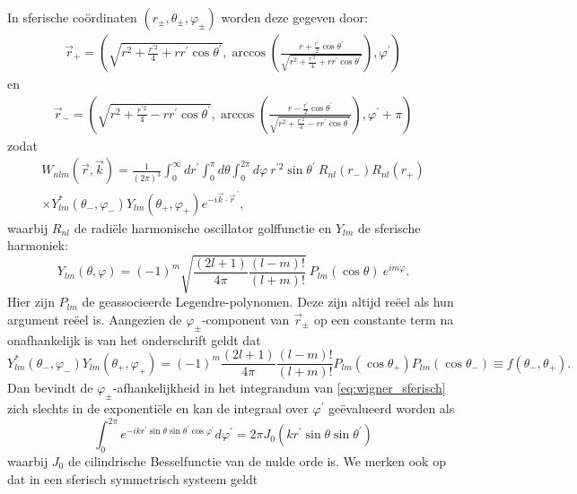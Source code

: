 \documentclass[11pt,twoside]{book}
\begin{document}
In sferische co\"{o}rdinaten $(r_\pm,\theta_\pm,\varphi_\pm)$ worden deze gegeven door:
\begin{align*}
\vec{r}_+ = (\sqrt{r^2+ \frac{r^{\prime 2}}{4} + r r^\prime \cos{\theta^\prime}}, \arccos \left(\frac{r + \frac{r^\prime}{2}\cos \theta^\prime}{\sqrt{r^2+ \frac{r^{\prime 2}}{4} + r r^\prime \cos{\theta^\prime} }} \right),\varphi^\prime) 
\end{align*}
en
\begin{align*}
\vec{r}_- = (\sqrt{r^2+ \frac{r^{\prime 2}}{4} - r r^\prime  \cos{\theta^\prime}}, \arccos \left(\frac{r -\frac{r^\prime}{2}\cos \theta^\prime}{\sqrt{r^2+ \frac{r^{\prime 2}}{4} - r r^\prime \cos{\theta^\prime} }} \right),\varphi^\prime+ \pi) 
\end{align*}
zodat
\begin{align} \label{eq:wigner_sferisch}
W_{nlm}(\vec{r},\vec{k}) = \frac{1}{(2\pi)^3} \int^\infty_0 dr^\prime \int^\pi_0 d\theta \int^{2\pi}_0 d\varphi\    r^{\prime 2} \sin \theta^\prime \ R_{nl}(r_-) R_{nl}(r_+) \nonumber \\ \times Y^*_{lm}(\theta_-,\varphi_-)  Y_{lm}(\theta_+,\varphi_+) e^{-i\vec{k}\cdot \vec{r}^{\ \prime}},
\end{align}
waarbij $R_{nl}$ de radi\"{e}le harmonische oscillator golffunctie en $Y_{lm}$ de sferische harmoniek:
\begin{equation}
Y_{lm}(\theta,\varphi) = (-1)^m \sqrt{\frac{(2l+1)}{4\pi}\frac{(l-m)!}{(l+m)!}}\  P_{lm}(\cos \theta) \ e^{im\varphi}.
\end{equation}
Hier zijn $P_{lm}$ de geassocieerde Legendre-polynomen. Deze zijn altijd re\"{e}el als hun argument re\"{e}el is.
Aangezien de $\varphi_\pm$-component van $\vec{r}_\pm$ op een constante term na onafhankelijk is van het onderschrift geldt dat
\begin{equation}
Y^*_{lm}(\theta_-,\varphi_-)  Y_{lm}(\theta_+,\varphi_+) = (-1)^m \frac{(2l+1)}{4\pi}\frac{(l-m)!}{(l+m)!}  P_{lm}(\cos \theta_+)  P_{lm}(\cos \theta_-) \equiv f(\theta_-,\theta_+).
\end{equation}
Dan bevindt de $\varphi_\pm$-afhankelijkheid in het integrandum van \eqref{eq:wigner_sferisch} zich slechts in de exponenti\"{e}le en kan de integraal over $\varphi^\prime$ ge\"{e}valueerd worden als
\begin{equation}
\int^{2\pi}_0  e^{-ikr^\prime \sin \theta \sin \theta^\prime \cos \varphi^\prime } d\varphi^\prime = 2\pi J_0(kr^\prime \sin \theta \sin \theta^\prime)
\end{equation}
waarbij $J_0$ de cilindrische Besselfunctie van de nulde orde is. We merken ook op dat in een sferisch symmetrisch systeem geldt
\end{document}
